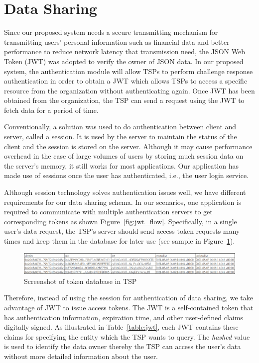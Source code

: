 \section{Data Sharing}
Since our proposed system needs a secure transmitting mechanism for transmitting users' personal information such as financial data and better performance to reduce network latency that transmission need, the JSON Web Token (JWT) was adopted to verify the owner of JSON data. In our proposed system, the authentication module will allow TSPs to perform challenge response authentication in order to obtain a JWT which allows TSPs to access a specific resource from the organization without authenticating again. Once JWT has been obtained from the organization, the TSP can send a request using the JWT to fetch data for a period of time.\par  
Conventionally, a solution was used to do authentication between client and server, called a session. It is used by the server to maintain the status of the client and the session is stored on the server. Although it may cause performance overhead in the case of large volumes of users by storing much session data on the server's memory, it still works for most applications. Our application has made use of sessions once the user has authenticated, i.e., the user login service.\par
Although session technology solves authentication issues well, we have different requirements for our data sharing schema. In our scenarios, one application is required to communicate with multiple authentication servers to get corresponding tokens as shown Figure~\ref{fig:jwt_flow}. Specifically, in a single user's data request, the TSP's server should send access token requests many times and keep them in the database for later use (see sample in Figure~\ref{fig:screenshot_database}). \par
\begin{figure}[htb]
    \centering
    \includegraphics[height=!,width=1\linewidth,keepaspectratio=true]{figures/screenshot_database.png}
    \caption{{\footnotesize Screenshot of token database in TSP}}
    \label{fig:screenshot_database}
\end{figure}

Therefore, instead of using the session for authentication of data sharing, we take advantage of JWT to issue access tokens. The JWT is a self-contained token that has authentication information, expiration time, and other user-defined claims digitally signed. As illustrated in Table~\ref{table:jwt}, each JWT contains these claims for specifying the entity which the TSP wants to query. The \textit{hashed} value is used to identify the data owner thereby the TSP can access the user's data without more detailed information about the user.\par



